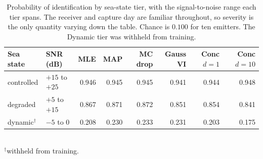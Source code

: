 \begin{table}[!htbp]
\centering
\caption{Probability of identification by sea-state tier, with the signal-to-noise range each tier spans. The receiver and capture day are familiar throughout, so severity is the only quantity varying down the table. Chance is $0.100$ for ten emitters. The Dynamic tier was withheld from training.}
\label{tab:poi}
\footnotesize
\begin{tabular}{llrrrrrr}
\toprule
Sea state & SNR (dB) & MLE & MAP & MC drop & Gauss VI & Conc $d{=}1$ & Conc $d{=}10$ \\
\midrule
controlled & $+15$ to $+25$ & 0.946 & 0.945 & 0.945 & 0.941 & 0.944 & 0.948 \\
degraded & $+5$ to $+15$ & 0.867 & 0.871 & 0.872 & 0.851 & 0.854 & 0.841 \\
dynamic$^{\dagger}$ & $-5$ to $0$ & 0.208 & 0.230 & 0.233 & 0.231 & 0.203 & 0.175 \\
\bottomrule
\end{tabular}
\\[2pt]\footnotesize $^{\dagger}$withheld from training.
\end{table}
